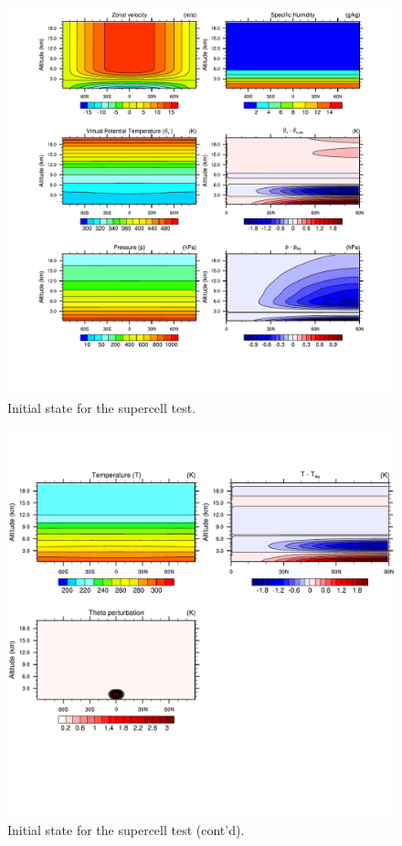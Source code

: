 \documentclass[times,doublespace]{fldauth}
\begin{document}
{\begin{figure}[tb]
\center\includegraphics[width=\linewidth]{plot_supercell_init.pdf}
  \caption{Initial state for the supercell test.}\label{fig:supercell_init_p1}
\end{figure} 
\begin{figure}[tb]
\center\includegraphics[width=\linewidth]{plot_supercell_init_p2.pdf}
  \caption{Initial state for the supercell test (cont'd).}\label{fig:supercell_init_p2}
\end{figure} 

}
\end{document}
